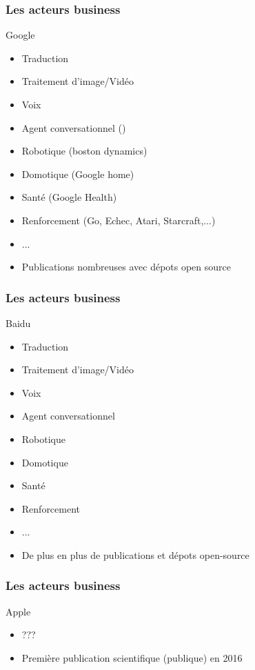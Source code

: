 \begin{frame}
  \frametitle{Les acteurs business}
  Google
  \begin{itemize}
  \item Traduction
  \item Traitement d'image/Vidéo
  \item Voix
  \item Agent conversationnel (\href{https://www.youtube.com/watch?v=d40jgFZ5hXk}{})
  \item Robotique (boston dynamics)
  \item Domotique (Google home)
  \item Santé (Google Health)
  \item Renforcement (Go, Echec, Atari, Starcraft,...)
  \item ...
  \item Publications nombreuses avec dépots open source
  \end{itemize}
\end{frame}

\begin{frame}
  \frametitle{Les acteurs business}
  Baidu
  \begin{itemize}
  \item Traduction
  \item Traitement d'image/Vidéo
  \item Voix
  \item Agent conversationnel
  \item Robotique
  \item Domotique
  \item Santé
  \item Renforcement
  \item ...
  \item De plus en plus de publications et dépots open-source
  \end{itemize}
\end{frame}

\begin{frame}
  \frametitle{Les acteurs business}
  Apple
  \begin{itemize}
  \item ???
  \item Première publication scientifique (publique) en 2016
  \end{itemize}
\end{frame}
